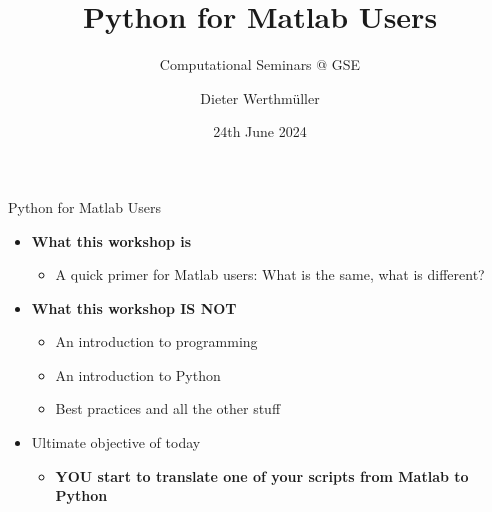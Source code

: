 \documentclass[usepdftitle=false, aspectratio=169]{beamer}
\title{Python for Matlab Users}
\subtitle{Computational Seminars @ GSE}
\date{24th June 2024}
\author{Dieter Werthmüller}
\institute{\dra\href{https://github.com/prisae/Python4MatlabUsers}{github.com/prisae/Python4MatlabUsers}}
\newcommand{\ato}{\addtocounter{framenumber}{1}}
\begin{document}

\ato %
\maketitle




\begin{frame}
  {Python for Matlab Users}

  \begin{itemize}\itemsep .6cm
    \item \textbf{What this workshop is}
      \begin{itemize}
        \item A quick primer for Matlab users: What is the same, what is different?
      \end{itemize}
    \item \textbf{What this workshop IS NOT}
      \begin{itemize}
        \item An introduction to programming
        \item An introduction to Python
        \item Best practices and all the other stuff
      \end{itemize}
    \item Ultimate objective of today
      \begin{itemize}
        \item \textbf{YOU start to translate one of your scripts from Matlab to
          Python}
      \end{itemize}
  \end{itemize}
\end{frame}
\end{document}
